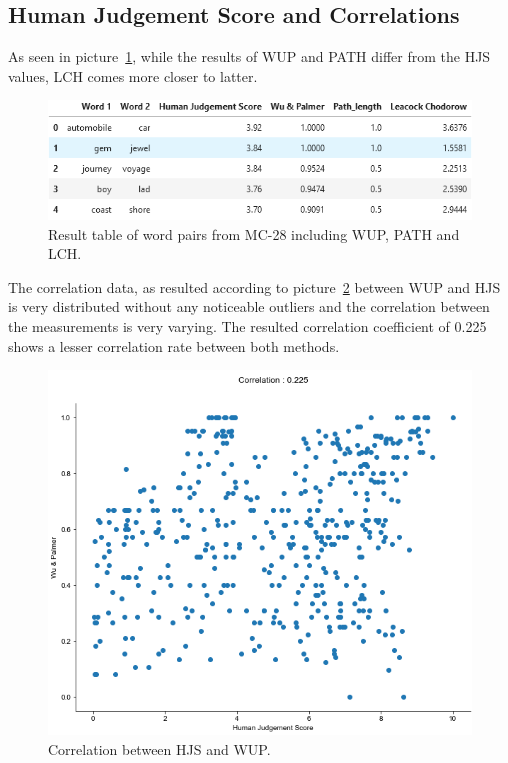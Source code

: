 \documentclass[conference]{IEEEtran}
\begin{document}
\newpage
\subsection{Human Judgement Score and Correlations}

As seen in picture~\ref{fig:hjs}, while the results of WUP and PATH differ from the HJS values, LCH comes more closer to latter.

\begin{figure}[h]
\centerline{\includegraphics[scale=0.6]{img/hjs.png}}
\caption{Result table of word pairs from MC-28 including WUP, PATH and LCH.}
\label{fig:hjs}
\end{figure}

The correlation data, as resulted according to picture~\ref{fig:wupcorr} between WUP and HJS is very distributed without any noticeable outliers and the correlation between the measurements is very varying. The resulted correlation coefficient of 0.225 shows a lesser correlation rate between both methods.

\begin{figure}[h]
\centerline{\includegraphics[scale=0.5]{img/wupcorr.png}}
\caption{Correlation between HJS and WUP.}
\label{fig:wupcorr}
\end{figure}
\end{document}
